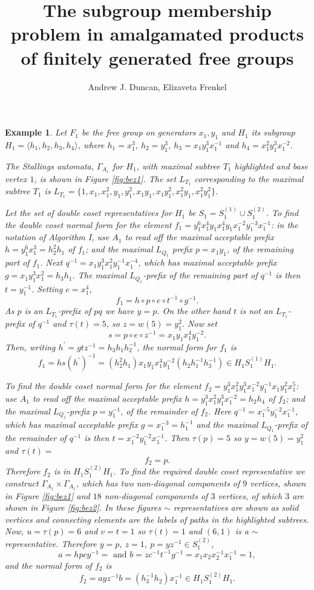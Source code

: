 \documentclass[a4paper,12pt]{article}
\title{The subgroup membership problem in amalgamated products of 
finitely generated free groups
}
\author{Andrew J. Duncan, Elizaveta Frenkel}
\newcommand{\G}{\Gamma }
\renewcommand{\t}{\tau }
\newtheorem{exam}[theorem]{Example}
\newenvironment{example}{\begin{exam} \rm}{\end{exam}}
\numberwithin{equation}{section}
\numberwithin{figure}{section}
\newcommand{\la}{\langle}
\newcommand{\ra}{\rangle}
\begin{document}
\begin{example}\label{ex:f_1}
Let $F_1$ be the free group on generators $x_1,y_1$ and $H_1$ its
subgroup $H_1=\la
h_1,h_2,h_3, h_4\ra$, where  $h_1= x_1^3$, $h_2=y_1^{3}$, 
$h_3=x_1y_1^{3}x_1^{-1}$ and $h_4=x_1^{2}y_1^{3}x_1^{-2}$. 

The Stallings automata, $\G_{A_1}$ for $H_1$,
with maximal subtree $T_1$ highlighted and base vertex $1$, is shown
in Figure \ref{fig:bez1}.
The set $L_{T_1}$ corresponding to the maximal subtree  $T_1$ is
 $L_{T_1}=\{1,x_1,x_1^{2},y_1, y_1^2, x_1y_1, x_1y_1^2, x_1^2y_1, x_1^2y_1^2 \}$.

Let the set of double coset representatives for $H_1$ be $S_1=S_1^{(1)}
\cup S_1^{(2)}$.
To find the double coset normal form for the element $f_1 =
y_1^6 x_1^4 y_1 x_1^4 y_1 x_1^{-2} y_1^{-3} x_1^{-1}$: 
in
the notation of Algorithm I, use
${A_1}$ to read off the maximal acceptable prefix 
$h=y_1^6 x_1^3=h_2^2h_1$ 
of $f_1$; and
the maximal $L_{Q_1}$ prefix $p=x_1y_1$, of the remaining part of $f_1$. Next
$q^{-1}=x_1y_1^3x_1^2y_1^{-1}x_1^{-4}$, which has maximal acceptable prefix
$g=x_1y_1^3x_1^2=h_3h_1$. The maximal $L_{Q_1}$-prefix of the remaining part of $q^{-1}$
is then $t=y_1^{-1}$. Setting $e=x_1^4$,
\[f_1=h\circ p\circ e\circ t^{-1}\circ g^{-1}.\]
As $p$ is an $L_{T_1}$-prefix of $pq$ we have $y=p$. On the other hand
$t$ is not an $L_{T_1}$-prefix of $q^{-1}$ and $\t(t)=5$, so $z=w(5)=y_1^{2}$.
Now set
\[s=p\circ e\circ z^{-1}=x_1y_1x_1^4y_1^{-2}.\]
Then, writing $h^\prime=gtz^{-1}=h_3h_1h_2^{-1}$, the normal form for $f_1$ is
\[f_1=hs(h^\prime)^{-1}=(h_2^{2}h_1)x_1y_1x_1^4y_1^{-2} (h_2h_1^{-1}h_3^{-1})\in H_1S_1^{(1)}H_1.\]

To find the double coset normal form for the element
$f_2=y_1^3x_1^2y_1^3x_1^{-2}y_1^{-1}x_1y_1^{2}x_1^5$: use
${A_1}$ to read off the maximal acceptable prefix 
  $h=y_1^3x_1^2y_1^3x_1^{-2}=h_2h_4$ of $f_2$;   and 
the maximal $L_{Q_1}$-prefix 
$p=y_1^{-1}$, 
of the remainder of $f_2$.
  Here 
$q^{-1}=x_1^{-5}y_1^{-2}x_1^{-1}$, which has maximal acceptable prefix 
$g=x_1^{-3}=h_1^{-1}$ and the maximal $L_{Q_1}$-prefix of the remainder
 of $q^{-1}$ is then $t=x_1^{-2}y_1^{-2}x_1^{-1}$. Then $\t(p)=5$ so $y=w(5)=y_1^2$ and 
$\t(t)=$
\[f_2=p.\]
Therefore $f_2$ is in $H_1S_1^{(2)}H_1$. To find the required
double coset representative we construct $\G_{A_1}\times
\G_{A_1}$, which has two non-diagonal components of $9$ vertices, shown in Figure \ref{fig:bez1} and $18$ non-diagonal components of $3$ vertices, of
which $3$ are shown in Figure \ref{fig:bez2}. In these figures 
$\sim$ representatives are  
shown as
solid vertices and  connecting elements are the labels of paths in the
highlighted subtrees.  
Now, $u=\t(p)=6$ and $v=t=1$ so $\t(t)=1$ and $(6,1)$  is a 
 $\sim$ representative. 
 Therefore $y=p$, $z=1$,
$p=yz^{-1}\in S_1^{(2)}$, 
\[a=hpcy^{-1}=
\textrm{ and } b=zc^{-1}t^{-1}g^{-1}=x_1 x_2 x_2^{-1} x_1^{-1}=1,\]
and the normal form of $f_2$ is
\[f_2=a yz^{-1} b=(h_3^{-1}h_2) x_1^{-1}\in H_1S_1^{(2)}H_1.\]
\end{example}
\end{document}
